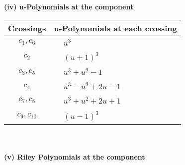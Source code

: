 \documentclass[1p]{elsarticle_modified}
\theoremstyle{definition}
\begin{document}
\newpage\renewcommand{\arraystretch}{1}
\flushleft \textbf{(iv) u-Polynomials at the component}\newline \\
\begin{tabular}{m{50pt}|m{274pt}}
Crossings & \hspace{64pt}u-Polynomials at each crossing \\
\hline $$\begin{aligned}c_{1},c_{6}\end{aligned}$$&$\begin{aligned}
&u^3
\end{aligned}$\\
\hline $$\begin{aligned}c_{2}\end{aligned}$$&$\begin{aligned}
&(u+1)^3
\end{aligned}$\\
\hline $$\begin{aligned}c_{3},c_{5}\end{aligned}$$&$\begin{aligned}
&u^3+u^2-1
\end{aligned}$\\
\hline $$\begin{aligned}c_{4}\end{aligned}$$&$\begin{aligned}
&u^3- u^2+2 u-1
\end{aligned}$\\
\hline $$\begin{aligned}c_{7},c_{8}\end{aligned}$$&$\begin{aligned}
&u^3+u^2+2 u+1
\end{aligned}$\\
\hline $$\begin{aligned}c_{9},c_{10}\end{aligned}$$&$\begin{aligned}
&(u-1)^3
\end{aligned}$\\
\hline
\end{tabular}\\~\\
\newpage\renewcommand{\arraystretch}{1}
\flushleft \textbf{(v) Riley Polynomials at the component}\newline \\
\end{document}
